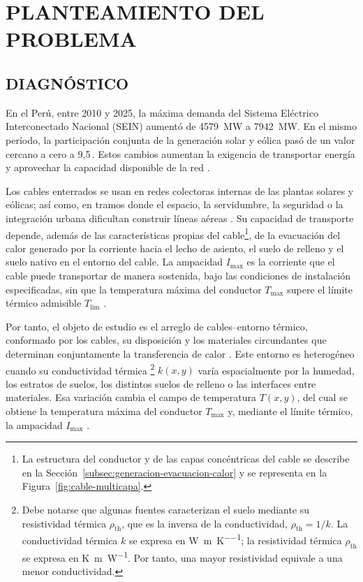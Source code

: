 \documentclass[11pt,a4paper,oneside]{report}
\newcommand{\Tmax}{T_{\max}}
\newcommand{\Imax}{I_{\max}}
\newcommand{\kx}{k(x,y)}
\newcommand{\rhoth}{\rho_{\mathrm{th}}}
\newcommand{\pct}{\mbox{\char37}}
\begin{document}
\clearpage
{}

\chapter{PLANTEAMIENTO DEL PROBLEMA}
\thispagestyle{empty}

\section{DIAGNÓSTICO}
\label{sec:diagnostico}

En el Perú, entre 2010 y 2025, la máxima demanda del Sistema Eléctrico Interconectado Nacional (SEIN) aumentó de \SI{4579}{\mega\watt} a \SI{7942}{\mega\watt}. En el mismo período, la participación conjunta de la generación solar y eólica pasó de un valor cercano a cero a 9,5\,\pct{}. Estos cambios aumentan la exigencia de transportar energía y aprovechar la capacidad disponible de la red \parencites{minem2025anuario2024}{minem2025indicadoresDiciembre}{coesMaximaDemanda}{iea2025transmissiongrid}.

Los cables enterrados se usan en redes colectoras internas de las plantas solares y eólicas; así como, en tramos donde el espacio, la servidumbre, la seguridad o la integración urbana dificultan construir líneas aéreas \parencite{cigre2023overheadLines}. Su capacidad de transporte depende, además de las características propias del cable\footnote{La estructura del conductor y de las capas concéntricas del cable se describe en la Sección~\ref{subsec:generacion-evacuacion-calor} y se representa en la Figura~\ref{fig:cable-multicapa}.}, de la evacuación del calor generado por la corriente hacia el lecho de asiento, el suelo de relleno y el suelo nativo en el entorno del cable. La ampacidad \(\Imax\) es la corriente que el cable puede transportar de manera sostenida, bajo las condiciones de instalación especificadas, sin que la temperatura máxima del conductor \(\Tmax\) supere el límite térmico admisible \(T_{\mathrm{lim}}\) \parencites[cláusulas~4--5]{iec60287}[3--5]{enescu2020}.

Por tanto, el objeto de estudio es el arreglo de cables--entorno térmico, conformado por los cables, su disposición y los materiales circundantes que determinan conjuntamente la transferencia de calor \parencites[1--3]{enescu2020}[41--42]{cigre2025}. Este entorno es heterogéneo cuando su conductividad térmica \footnote{Debe notarse que algunas fuentes caracterizan el suelo mediante su resistividad térmica \(\rhoth\), que es la inversa de la conductividad, \(\rhoth=1/k\). La conductividad térmica $k$ se expresa en \si{\watt\per\metre\per\kelvin}; la resistividad térmica $\rhoth$ se expresa en \si{\kelvin\metre\per\watt}. Por tanto, una mayor resistividad equivale a una menor conductividad.} \(\kx\) varía espacialmente por la humedad, los estratos de suelos, los distintos suelos de relleno o las interfaces entre materiales. Esa variación cambia el campo de temperatura \(T(x,y)\), del cual se obtiene la temperatura máxima del conductor \(\Tmax\) y, mediante el límite térmico, la ampacidad \(\Imax\) \parencites[3--4]{enescu2021}[1,6--7]{khumalo2025}[3]{xing2023}.
\end{document}
